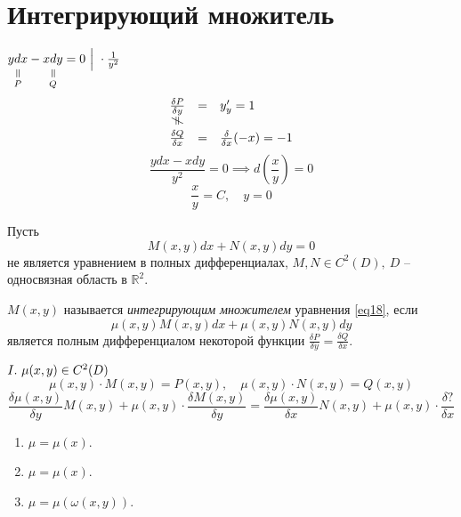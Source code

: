 

\section{Интегрирующий множитель}

\begin{note}
    $\equalto{ydx}{P} - \equalto{xdy}{Q} = 0 \ \Big| \ \cdot \frac{1}{y^2}$
    \[
        \begin{array}{ccl}
            \frac{\delta P}{\delta y} & = & y_y' = 1                         \\
            \vertneq                  &   &                                  \\
            \frac{\delta Q}{\delta x} & = & \frac{\delta}{\delta x}(-x) = -1
        \end{array}
    \]
    \[
        \frac{ydx - xdy}{y^2} = 0 \implies d\left(\frac{x}{y}\right) = 0
    \]
    \[
        \frac{x}{y} = C, \quad y = 0
    \]
\end{note}

\begin{definition}
    Пусть
    \begin{equation}\label{eq18}
        M(x,y)dx + N(x,y)dy = 0
    \end{equation}
    не является уравнением в полных дифференциалах, $M,N \in C^2(D), \ D$ -- односвязная область в $\mathbb{R}^2$.

    $M(x,y)$ называется \emph{интегрирующим множителем} уравнения \ref{eq18}, если
    \[
        \mu(x,y)M(x,y)dx + \mu(x,y)N(x,y)dy
    \]
    является полным дифференциалом некоторой функции $\frac{\delta P}{\delta y} = \frac{\delta Q}{\delta x}$.
\end{definition}

\begin{note}
    $\RomanNumeralCaps{1}. \ \mu(x,y) \in C^2(D)$
    \[
        \mu(x,y)\cdot M(x,y) = P(x,y), \quad \mu(x,y)\cdot N(x,y) = Q(x,y)
    \]
    \[
        \frac{\delta \mu(x,y)}{\delta y}M(x,y) + \mu(x,y)\cdot\frac{\delta M(x,y)}{\delta y} = \frac{\delta\mu(x,y)}{\delta x}N(x,y) + \mu(x,y)\cdot\frac{\delta ?}{\delta x}
    \]
    \begin{enumerate}
        \item $\mu = \mu(x)$.
        \item $\mu = \mu(x)$.
        \item $\mu = \mu(\omega(x,y))$.
    \end{enumerate}
\end{note}

